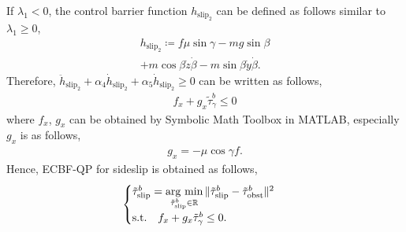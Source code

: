 If $ \lambda_1 < 0 $, the control barrier function $ h_{\mathrm{slip}_2} $ can be defined as follows similar to $ \lambda_1 \geq 0 $,
\begin{align}
    \label{eq:slip_control_barrier_function_2}
    h_{\mathrm{slip}_2} \coloneqq f \mu \sin \gamma - mg \sin \beta \\
    + m \cos \beta \dot{z} \dot{\beta} - m \sin \beta \dot{y} \dot{\beta}.  
\end{align}
Therefore, $ \ddot{h}_{\mathrm{slip}_2} + \alpha_4 \dot{h}_{\mathrm{slip}_2}  + \alpha_5 \dot{h}_{\mathrm{slip}_2} \geq 0 $ can be written as follows,
\begin{align}
    \label{eq:sideslipQP_2}
    f_x + g_x \tilde{\tau}_{\gamma}^b \leq 0
\end{align}
where $ f_x $, $ g_x $ can be obtained by Symbolic Math Toolbox in MATLAB, especially $ g_x $ is as follows,
\begin{align*}
    g_x = - \mu \cos \gamma f.
\end{align*}
Hence, ECBF-QP for sideslip is obtained as follows,
\begin{align}
    \label{eq:slipQP_final}
    \begin{cases}
        \tilde{\tau}_{\mathrm{slip}}^b = \mathop{\rm arg~min}\limits_{\tilde{\tau}_{\mathrm{slip}}^b \in \mathbb{R}} \| \tilde{\tau}_{\mathrm{slip}}^b - \tilde{\tau}_{\mathrm{obst}}^b \| ^2 \\
        \mathrm{s.t.} \quad f_x + g_x \tilde{\tau}_{\gamma}^b \leq 0.
        \end{cases}
\end{align}

